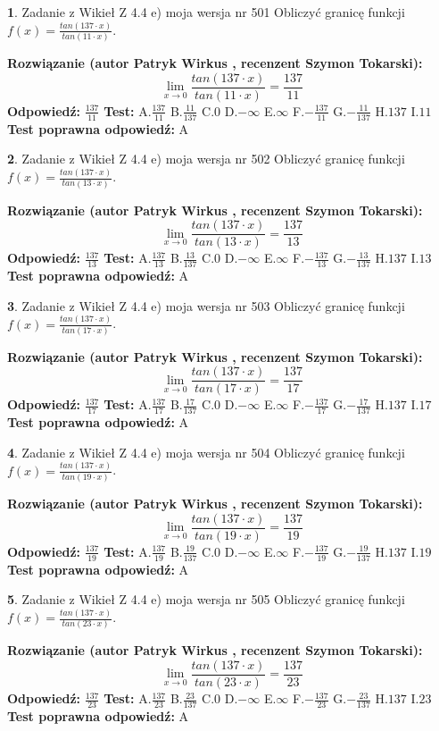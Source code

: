 \documentclass[12pt, a4paper]{article}
\theoremstyle{definition} %
\newtheorem{zad}{}
\newcommand{\zadStart}[1]{\begin{zad}#1\newline}
\newcommand{\zadStop}{\end{zad}}
\newcommand{\rozwStart}[2]{\noindent \textbf{Rozwiązanie (autor #1 , recenzent #2): }\newline}
\newcommand{\rozwStop}{\newline}
\newcommand{\odpStart}{\noindent \textbf{Odpowiedź:}\newline}
\newcommand{\odpStop}{\newline}
\newcommand{\testStart}{\noindent \textbf{Test:}\newline}
\newcommand{\testStop}{\newline}
\newcommand{\kluczStart}{\noindent \textbf{Test poprawna odpowiedź:}\newline}
\newcommand{\kluczStop}{\newline}
\begin{document}
\zadStart{Zadanie z Wikieł Z 4.4 e) moja wersja nr 501}
Obliczyć granicę funkcji $f(x)=\frac{tan(137\cdot x)}{tan(11\cdot x)}$.
\zadStop
\rozwStart{Patryk Wirkus}{Szymon Tokarski}
$$\lim\limits_{x\to 0}\frac{tan(137\cdot x)}{tan(11\cdot x)}=
\frac{137}{11}$$
\rozwStop
\odpStart
$\frac{137}{11}$
\odpStop
\testStart
A.$\frac{137}{11}$
B.$\frac{11}{137}$
C.$0$
D.$-\infty$
E.$\infty$
F.$-\frac{137}{11}$
G.$-\frac{11}{137}$
H.$137$
I.$11$
\testStop
\kluczStart
A
\kluczStop



\zadStart{Zadanie z Wikieł Z 4.4 e) moja wersja nr 502}
Obliczyć granicę funkcji $f(x)=\frac{tan(137\cdot x)}{tan(13\cdot x)}$.
\zadStop
\rozwStart{Patryk Wirkus}{Szymon Tokarski}
$$\lim\limits_{x\to 0}\frac{tan(137\cdot x)}{tan(13\cdot x)}=
\frac{137}{13}$$
\rozwStop
\odpStart
$\frac{137}{13}$
\odpStop
\testStart
A.$\frac{137}{13}$
B.$\frac{13}{137}$
C.$0$
D.$-\infty$
E.$\infty$
F.$-\frac{137}{13}$
G.$-\frac{13}{137}$
H.$137$
I.$13$
\testStop
\kluczStart
A
\kluczStop



\zadStart{Zadanie z Wikieł Z 4.4 e) moja wersja nr 503}
Obliczyć granicę funkcji $f(x)=\frac{tan(137\cdot x)}{tan(17\cdot x)}$.
\zadStop
\rozwStart{Patryk Wirkus}{Szymon Tokarski}
$$\lim\limits_{x\to 0}\frac{tan(137\cdot x)}{tan(17\cdot x)}=
\frac{137}{17}$$
\rozwStop
\odpStart
$\frac{137}{17}$
\odpStop
\testStart
A.$\frac{137}{17}$
B.$\frac{17}{137}$
C.$0$
D.$-\infty$
E.$\infty$
F.$-\frac{137}{17}$
G.$-\frac{17}{137}$
H.$137$
I.$17$
\testStop
\kluczStart
A
\kluczStop



\zadStart{Zadanie z Wikieł Z 4.4 e) moja wersja nr 504}
Obliczyć granicę funkcji $f(x)=\frac{tan(137\cdot x)}{tan(19\cdot x)}$.
\zadStop
\rozwStart{Patryk Wirkus}{Szymon Tokarski}
$$\lim\limits_{x\to 0}\frac{tan(137\cdot x)}{tan(19\cdot x)}=
\frac{137}{19}$$
\rozwStop
\odpStart
$\frac{137}{19}$
\odpStop
\testStart
A.$\frac{137}{19}$
B.$\frac{19}{137}$
C.$0$
D.$-\infty$
E.$\infty$
F.$-\frac{137}{19}$
G.$-\frac{19}{137}$
H.$137$
I.$19$
\testStop
\kluczStart
A
\kluczStop



\zadStart{Zadanie z Wikieł Z 4.4 e) moja wersja nr 505}
Obliczyć granicę funkcji $f(x)=\frac{tan(137\cdot x)}{tan(23\cdot x)}$.
\zadStop
\rozwStart{Patryk Wirkus}{Szymon Tokarski}
$$\lim\limits_{x\to 0}\frac{tan(137\cdot x)}{tan(23\cdot x)}=
\frac{137}{23}$$
\rozwStop
\odpStart
$\frac{137}{23}$
\odpStop
\testStart
A.$\frac{137}{23}$
B.$\frac{23}{137}$
C.$0$
D.$-\infty$
E.$\infty$
F.$-\frac{137}{23}$
G.$-\frac{23}{137}$
H.$137$
I.$23$
\testStop
\kluczStart
A
\kluczStop
\end{document}
